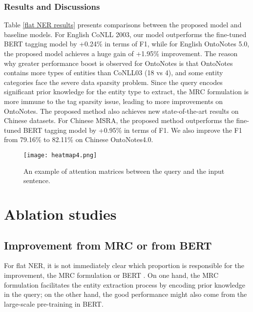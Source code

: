 \documentclass[11pt,a4paper]{article}
\begin{document}
\subsubsection{Results and Discussions}Table \ref{flat NER results} presents  comparisons between the proposed model and  baseline models. For English CoNLL 2003, our model outperforms the fine-tuned BERT tagging model by +0.24\% 
in terms of F1, while for 
English OntoNotes 5.0, the proposed model achieves a huge gain of +1.95\% improvement. 
The reason why greater performance boost is observed for OntoNotes is that 
OntoNotes contains more types of entities than CoNLL03 (18 vs 4), and some entity categories face the severe data sparsity problem. 
Since the query  encodes significant prior knowledge for the entity type to extract, the MRC formulation is more immune to the tag sparsity issue, 
leading to more improvements on OntoNotes. 
The proposed method also achieves new state-of-the-art results on Chinese datasets. 
For Chinese MSRA, the proposed method outperforms the fine-tuned BERT tagging model by +0.95\% in terms of F1. 
We also improve the F1 from 79.16\% to 82.11\% on Chinese OntoNotes4.0. 



\begin{figure*}[t]
\centering
\texttt{[image: heatmap4.png]}
\caption{An example of attention matrices between the query and the input sentence.} 
\label{headmap_abalation}
\end{figure*}



\section{Ablation studies}


\subsection{Improvement from MRC or from BERT} 
For flat NER, it is not immediately clear which proportion is responsible for the improvement, the MRC formulation or BERT \cite{devlin2018bert}. 
On one hand, the MRC formulation facilitates the entity extraction process by encoding prior knowledge in the query; on the other hand, the good performance might also come from the large-scale pre-training in BERT.
\end{document}
